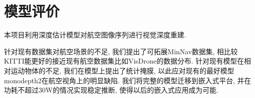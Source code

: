 \section{模型评价}

    本项目利用深度估计模型对航空图像序列进行视觉深度重建. 
    
    针对现有数据集对航空场景的不足, 我们提出了可拓展MinNav数据集, 相比较KITTI能更好的接近现有航空数据集比如VisDrone的数据分布. 
    针对现有模型在相对运动物体的不足, 我们在模型上提出了统计掩膜, 以此应对现有的最好模型monodepth2在航空视角上的明显缺陷.
    我们将完整的模型迁移到嵌入式平台, 并在功耗不超过30W的情况实现稳定推断, 使得以后的嵌入式应用成为可能.
     